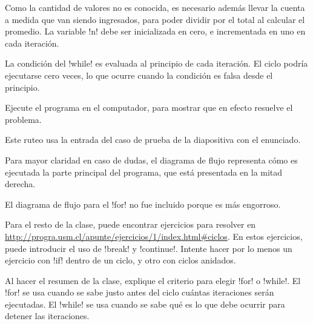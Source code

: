 \documentclass[10pt]{article}
\begin{document}
  Como la cantidad de valores no es conocida,
  es necesario además llevar la cuenta a medida que van siendo ingresados,
  para poder dividir por el total al calcular el promedio.
  La variable \li!n! debe ser inicializada en cero,
  e incrementada en uno en cada iteración.

  La condición del \li!while! es evaluada al principio de cada iteración.
  El ciclo podría ejecutarse cero veces,
  lo que ocurre cuando la condición es falsa desde el principio.

  Ejecute el programa en el computador,
  para mostrar que en efecto resuelve el problema.


  Este ruteo usa la entrada del caso de prueba de la diapositiva con el enunciado.


  Para mayor claridad en caso de dudas,
  el diagrama de flujo representa cómo es ejecutada
  la parte principal del programa,
  que está presentada en la mitad derecha.

  El diagrama de flujo para el \li!for! no fue incluido
  porque es más engorroso.

  Para el resto de la clase,
  puede encontrar ejercicios para resolver en
  \url{http://progra.usm.cl/apunte/ejercicios/1/index.html#ciclos}.
  En estos ejercicios, puede introducir el uso de \li!break! y \li!continue!.
  Intente hacer por lo menos un ejercicio con \li!if! dentro de un ciclo,
  y otro con ciclos anidados.

  Al hacer el resumen de la clase,
  explique el criterio para elegir \li!for! o \li!while!.
  El \li!for! se usa cuando se sabe justo antes del ciclo
  cuántas iteraciones serán ejecutadas.
  El \li!while! se usa cuando se sabe qué es lo que debe ocurrir
  para detener las iteraciones.
\end{document}
